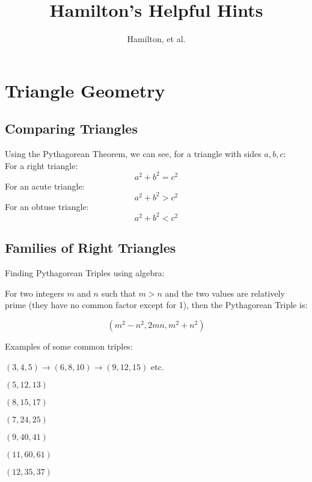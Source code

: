 \documentclass[final, letterpaper, 12pt]{article}
\author{Hamilton, et al.}
\date{}
\title{Hamilton's Helpful Hints}
\begin{document}
 
\maketitle 

\section{Triangle Geometry}	
	 \subsection{Comparing Triangles}\label{sec:using the Pythagorean Theorem}
		Using the Pythagorean Theorem, we can see, for a triangle with sides $a, b, c$: \\
		For a right triangle:
		\begin{equation}
		 	a^2+b^2 = c^2
		\end{equation}
		For an acute triangle:
		\begin{equation}
			a^2+b^2 > c^2
		\end{equation}
		For an obtuse triangle: 
		\begin{equation}
			a^2+b^2 < c^2
		\end{equation}
	 
	 \subsection{Families of Right Triangles}\label{sec: families of right triangles}
		Finding Pythagorean Triples using algebra:
		
		For two integers $m$ and $n$ such that $m > n$ and the two values are relatively prime (they have no common factor except for 1), then the Pythagorean Triple is:
		
		\begin{equation}\label{sec: method of forming Pythagorean Triples}
			(m^2 - n^2, 2mn, m^2 + n^2)
		\end{equation}
		
		Examples of some common triples:
		
		$(3, 4, 5) {\rightarrow} (6, 8, 10) {\rightarrow} (9, 12, 15)$ etc.
		
		$(5, 12, 13)$
		
		$(8, 15, 17)$
		
		$(7, 24, 25)$
		
		$(9, 40, 41)$
		
		$(11, 60, 61)$
		
		$(12, 35, 37)$
		
\end{document}
